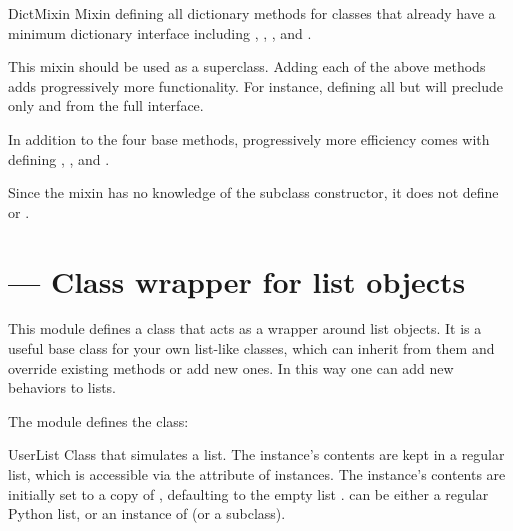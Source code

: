 \begin{classdesc}{DictMixin}{}
Mixin defining all dictionary methods for classes that already have
a minimum dictionary interface including ,
, , and .

This mixin should be used as a superclass.  Adding each of the
above methods adds progressively more functionality.  For instance,
defining all but  will preclude only 
and  from the full interface.

In addition to the four base methods, progressively more efficiency
comes with defining , , and
.

Since the mixin has no knowledge of the subclass constructor, it
does not define  or .
\end{classdesc}


\section{ ---
         Class wrapper for list objects}




This module defines a class that acts as a wrapper around
list objects.  It is a useful base class for
your own list-like classes, which can inherit from
them and override existing methods or add new ones.  In this way one
can add new behaviors to lists.

The  module defines the  class:

\begin{classdesc}{UserList}{}
Class that simulates a list.  The instance's
contents are kept in a regular list, which is accessible via the
 attribute of  instances.  The instance's
contents are initially set to a copy of , defaulting to the
empty list \code{[]}.   can be either a regular Python list,
or an instance of  (or a subclass).
\end{classdesc}

